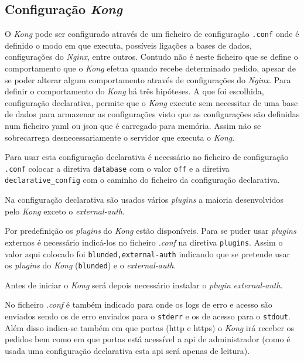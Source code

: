 \subsection{Configuração \textit{Kong}}
O \textit{Kong} pode ser configurado através de um ficheiro de configuração \texttt{.conf} onde é definido o modo em que executa, possíveis ligações a bases de dados, configurações do \textit{Nginx}, entre outros. Contudo não é neste ficheiro que se define o comportamento que o \textit{Kong} efetua quando recebe determinado pedido, apesar de se poder alterar algum comportamento através de configurações do \textit{Nginx}. Para definir o comportamento do \textit{Kong} há três hipóteses. A que foi escolhida, configuração declarativa, permite que o \textit{Kong} execute sem necessitar de uma base de dados para armazenar as configurações visto que as configurações são definidas num ficheiro \acrshort{yaml} ou \acrshort{json} que é carregado para memória. Assim não se sobrecarrega desnecessariamente o servidor que executa o \textit{Kong}.

Para usar esta configuração declarativa é necessário no ficheiro de configuração \texttt{.conf} colocar a diretiva \texttt{database} com o valor \texttt{off} e a diretiva \texttt{declarative\_config} com o caminho do ficheiro da configuração declarativa.

Na configuração declarativa são usados vários \textit{plugins} a maioria desenvolvidos pelo \textit{Kong} exceto o \textit{external-auth}. 

Por predefinição os \textit{plugins} do \textit{Kong} estão disponíveis. Para se puder usar \textit{plugins} externos é necessário indicá-los no ficheiro \textit{.conf} na diretiva \texttt{plugins}. Assim o valor aqui colocado foi \texttt{blunded,external-auth} indicando que se pretende usar os \textit{plugins} do \textit{Kong} (\texttt{blunded}) e o \textit{external-auth}. 

Antes de iniciar o \textit{Kong} será depois necessário instalar o \textit{plugin} \textit{external-auth}. 

No ficheiro \textit{.conf} é também indicado para onde os logs de erro e acesso são enviados sendo os de erro enviados para o \texttt{stderr} e os de acesso para o \texttt{stdout}. Além disso indica-se também em que portas (\acrshort{http} e \acrshort{https}) o \textit{Kong} irá receber os pedidos bem como em que portas está acessível a \acrshort{api} de administrador (como é usada uma configuração declarativa esta \acrshort{api} será apenas de leitura).

